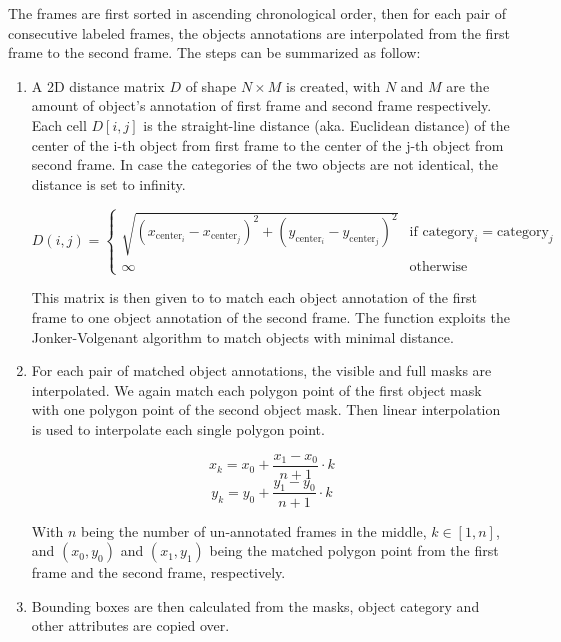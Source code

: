 The frames are first sorted in ascending chronological order, then for each pair of consecutive labeled frames, the objects annotations are interpolated from the first frame to the second frame. The steps can be summarized as follow: 
\begin{enumerate}
	\item A 2D distance matrix $D$ of shape $N \times M$  is created, with $N$ and $M$  are the amount of object's annotation of first frame and second frame respectively. Each cell $D[i,j]$ is the straight-line distance (aka. Euclidean distance) of the center of the i-th object from first frame to the center of the j-th object from second frame. In case the categories of the two objects are not identical, the distance is set to infinity. 
	
	\[ D(i,j) = \begin{cases} 
		\sqrt{{(x_{\text{{center}}_i} - x_{\text{{center}}_j})^2 + (y_{\text{{center}}_i} - y_{\text{{center}}_j})^2}} & \text{if } \text{{category}}_i = \text{{category}}_j \\
		\infty & \text{otherwise}
	\end{cases} \]
	
	This matrix is then given to to match each object annotation of the first frame to one object annotation of the second frame. The  function exploits the Jonker-Volgenant algorithm to match objects with minimal distance. %
	
	\item For each pair of matched object annotations, the visible and full masks are interpolated. We again match each polygon point of the first object mask with one polygon point of the second object mask. Then linear interpolation is used to interpolate each single polygon point. 
	
	\[
	x_k = x_0 + \frac{{x_1 - x_0}}{{n + 1}} \cdot k
	\]
	\[
	y_k = y_0 + \frac{{y_1 - y_0}}{{n + 1}} \cdot k
	\]
	
	With \(n\) being the number of un-annotated frames in the middle, \(k \in [1, n]\), and \((x_0, y_0)\) and \((x_1, y_1)\) being the matched polygon point from the first frame and the second frame, respectively.
	
	\item Bounding boxes are then calculated from the masks, object category and other attributes are copied over.  
\end{enumerate}

